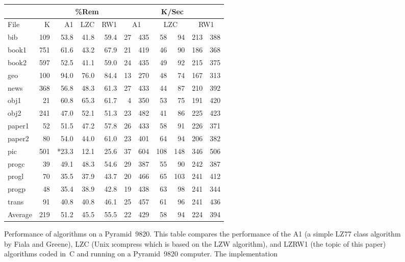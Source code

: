 \begin{figure}
\begin{center}
\begin{tabular}{|lr|rrr||r|r|r|}
\cline{3-8}
\multicolumn{2}{l|}{\hbox{}}  & \multicolumn{3}{c||}{\%Rem} & \multicolumn{3}{c|}{K/Sec} \\ \hline
File   &      K &   A1 &  LZC &  RW1 & \multicolumn{1}{c}{A1} & \multicolumn{1}{c}{LZC} & \multicolumn{1}{c|}{RW1} \\ \hline
bib    &    109 & 53.8 & 41.8 & 59.4 &  27~~435 &  58~~~94 & 213~~388 \\
book1  &    751 & 61.6 & 43.2 & 67.9 &  21~~419 &  46~~~90 & 186~~368 \\
book2  &    597 & 52.5 & 41.1 & 59.0 &  24~~435 &  49~~~92 & 215~~375 \\
geo    &    100 & 94.0 & 76.0 & 84.4 &  13~~270 &  48~~~74 & 167~~313 \\
news   &    368 & 56.8 & 48.3 & 61.3 &  27~~433 &  44~~~87 & 210~~392 \\
obj1   &     21 & 60.8 & 65.3 & 61.7 &   4~~350 &  53~~~75 & 191~~420 \\
obj2   &    241 & 47.0 & 52.1 & 51.3 &  23~~482 &  41~~~86 & 225~~423 \\
paper1 &     52 & 51.5 & 47.2 & 57.8 &  26~~433 &  58~~~91 & 226~~371 \\
paper2 &     80 & 54.0 & 44.0 & 61.0 &  23~~401 &  64~~~94 & 206~~382 \\
pic    &    501 &*23.3 & 12.1 & 25.6 &  37~~604 & 108~~148 & 346~~506 \\
progc  &     39 & 49.1 & 48.3 & 54.6 &  29~~387 &  55~~~90 & 242~~387 \\
progl  &     70 & 35.5 & 37.9 & 43.7 &  20~~466 &  65~~103 & 241~~412 \\
progp  &     48 & 35.4 & 38.9 & 42.8 &  19~~438 &  63~~~98 & 241~~344 \\
trans  &     91 & 40.8 & 40.8 & 46.1 &  25~~457 &  61~~~96 & 241~~436 \\ \hline
Average&    219 & 51.2 & 45.5 & 55.5 &  22~~429 &  58~~~94 & 224~~394 \\ \hline
\end{tabular}
\end{center}
%
{Performance of algorithms on a Pyramid~9820.}{%
%
This table  compares the performance  of the  A1 (a simple  LZ77 class
algorithm by Fiala and Greene),  LZC (Unix \i{compress} which is based
on the LZW algorithm), and LZRW1  (the topic of this paper) algorithms
coded in~C and running on  a Pyramid~9820 computer. The implementation
}
\end{figure}
